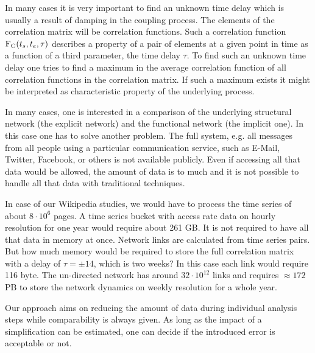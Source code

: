 \documentclass[a4paper,10pt]{scrbook}
\begin{document}
In many cases it is very important to find an unknown time delay which is usually a result of damping in the coupling process. The elements of the correlation matrix will be correlation functions. Such a correlation function $\textrm F_{\rm C}(t_s,t_e,\tau)$ describes a property of a pair of elements at a given point in time as a function of a third parameter, the time delay $\tau$.
To find such an unknown time delay one tries to find a maximum in the average correlation function of all correlation functions in the correlation matrix. If such a maximum exists it might be interpreted as characteristic property of the underlying process.      

In many cases, one is interested in a comparison of the underlying structural network (the explicit network) and the functional network (the implicit one). In this case one has to solve another problem. The full system, e.g. all messages from all people using a particular communication service, such as E-Mail, Twitter, Facebook, or others is not available publicly. Even if accessing all that data would be allowed, the amount of data is to much and it is not possible to handle all that data with traditional techniques. 

In case of our Wikipedia studies, we would have to process the time series of about $8 \cdot 10^6$ pages. A time series bucket with access rate data on hourly resolution for one year would require about 261 GB. It is not required to have all that data in memory at once. Network links are calculated from time series pairs. But how much memory would be required to store the full correlation matrix with a delay of $\tau = \pm 14$, which is two weeks? In this case each link would require 116 byte. The un-directed network has around $32 \cdot 10^{12}$ links and requires $\approx 172$ PB to store the network dynamics on weekly resolution for a whole year.

Our approach aims on reducing the amount of data during individual analysis steps while comparability is always given. As long as the impact of a simplification can be estimated, one can decide if the introduced error is acceptable or not.
\end{document}
